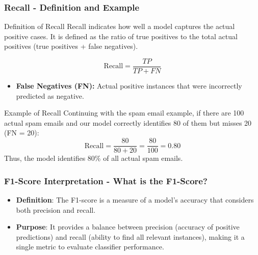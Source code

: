 \documentclass[aspectratio=169]{beamer}
\begin{document}
\begin{frame}[fragile]
    \frametitle{Recall - Definition and Example}
    \begin{block}{Definition of Recall}
        Recall indicates how well a model captures the actual positive cases. It is defined as the ratio of true positives to the total actual positives (true positives + false negatives).
    \end{block}

    \begin{equation}
        \text{Recall} = \frac{TP}{TP + FN}
    \end{equation}

    \begin{itemize}
        \item \textbf{False Negatives (FN):} Actual positive instances that were incorrectly predicted as negative.
    \end{itemize}

    \begin{block}{Example of Recall}
        Continuing with the spam email example, if there are 100 actual spam emails and our model correctly identifies 80 of them but misses 20 (FN = 20):
        \begin{equation}
            \text{Recall} = \frac{80}{80 + 20} = \frac{80}{100} = 0.80
        \end{equation}
        Thus, the model identifies 80\% of all actual spam emails.
    \end{block}
\end{frame}

\begin{frame}[fragile]
    \frametitle{F1-Score Interpretation - What is the F1-Score?}
    \begin{itemize}
        \item \textbf{Definition}: The F1-score is a measure of a model's accuracy that considers both precision and recall. 
        \item \textbf{Purpose}: It provides a balance between precision (accuracy of positive predictions) and recall (ability to find all relevant instances), making it a single metric to evaluate classifier performance.
    \end{itemize}
\end{frame}
\end{document}
